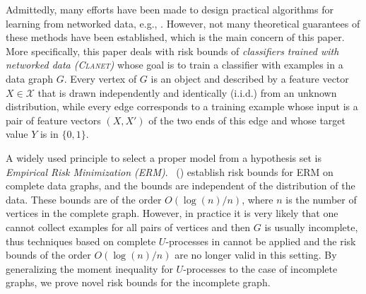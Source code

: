 \documentclass[letterpaper]{article} %
\newcommand{\xspace}{\mathcal{X}}
\newcommand{\pair}[1]{(#1)}
\newcommand{\problemabbr}{\textnormal{C}\textsc{lanet}}
\newcommand{\set}[1]{\{#1\}}
\newcommand{\red}[1]{\textcolor{red}{#1}}
\newcommand{\todo}[1]{\red{\textsc{todo:} #1}}
\newcommand{\citet}[1]{\citeauthor{#1}\ (\citeyear{#1})}
\begin{document}

Admittedly, many efforts have been made to design practical algorithms for learning from networked data, e.g., \cite{liben2007link,macskassy2007classification,li2016robust,garcia2016combining}. 
However, not many theoretical guarantees of these methods have been established, which is the main concern of this paper. More specifically, this paper deals with risk bounds of \emph{classifiers trained with networked data (\problemabbr{})
} whose goal is to train a classifier with examples in a data graph $G$. 
Every vertex of $G$ is an object and described by a feature vector $X\in \xspace{}$ that is drawn independently and identically (i.i.d.) from an unknown distribution, while every edge corresponds to a training example whose input is a pair of feature vectors $\pair{X,X'}$ of the two ends of this edge and whose target value $Y$ is in $\{0,1\}$.

A widely used principle to select a proper model from a hypothesis set is \emph{Empirical Risk Minimization (ERM)}. %
\citet{papa2016graph} establish risk bounds for ERM on complete data graphs, and the bounds are independent of the distribution of the data. 
These bounds are of the order $O(\log(n)/n)$, where $n$ is the number of vertices in the complete graph. 
However, in practice it is very likely that one cannot collect examples for all pairs of vertices and then $G$ is usually incomplete, thus techniques based on complete $U$-processes in \cite{papa2016graph} cannot be applied and the risk bounds of the order $O(\log(n)/n)$ are no longer valid in this setting. 
By generalizing the moment inequality for $U$-processes to the case of incomplete graphs, we prove novel risk bounds for the incomplete graph.  
\end{document}
